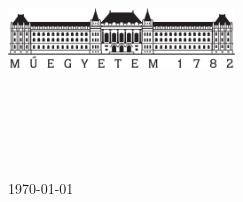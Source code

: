 \hypersetup{pageanchor=false}
\begin{titlepage}
\begin{center}
\includegraphics[width=60mm,keepaspectratio]{figures/bme_logo.pdf}\\
\vspace{0.3cm}
\textbf{\bme}\\
\textmd{\vik}\\
\textmd{\viktanszek}\\[5cm]

\textsc{\Large \vikdoktipus}

\vspace{0.4cm}
{\huge \bfseries \vikcim}\\[0.8cm]
\vspace{0.5cm}
\begin{center}
\textsc{\Large \freeme}
\vspace{0.4cm}
\end{center}
\textsc{\Large \konzulnev}

\vfill
{\large \today}
\end{center}
\end{titlepage}
\hypersetup{pageanchor=false}

